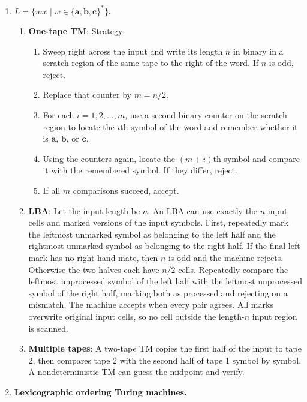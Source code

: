 \begin{enumerate}[{11.}1. ]
\item \textbf{$L = \{ww \mid w\in\{\pmb{a},\pmb{b},\pmb{c}\}^*\}$.}

\begin{enumerate}
\item \textbf{One-tape TM}:
Strategy:
\begin{enumerate}[1.]
\item Sweep right across the input and write its length $n$ in binary in a scratch
region of the same tape to the right of the word. If $n$ is odd, reject.
\item Replace that counter by $m=n/2$.
\item For each $i=1,2,\ldots,m$, use a second binary counter on the scratch region
to locate the $i$th symbol of the word and remember whether it is $\pmb{a}$,
$\pmb{b}$, or $\pmb{c}$.
\item Using the counters again, locate the $(m+i)$th symbol and compare it with
the remembered symbol. If they differ, reject.
\item If all $m$ comparisons succeed, accept.
\end{enumerate}

\item \textbf{LBA}: Let the input length be $n$. An LBA can use exactly the $n$
input cells and marked versions of the input symbols. First, repeatedly mark the
leftmost unmarked symbol as belonging to the left half and the rightmost
unmarked symbol as belonging to the right half. If the final left mark has no
right-hand mate, then $n$ is odd and the machine rejects. Otherwise the two
halves each have $n/2$ cells. Repeatedly compare the leftmost unprocessed symbol
of the left half with the leftmost unprocessed symbol of the right half, marking
both as processed and rejecting on a mismatch. The machine accepts when every
pair agrees. All marks overwrite original input cells, so no cell outside the
length-$n$ input region is scanned.

\item \textbf{Multiple tapes}: A two-tape TM copies the first half of the input to tape 2, then compares tape 2 with the second half of tape 1 symbol by symbol. A nondeterministic TM can guess the midpoint and verify.
\end{enumerate}

\item \textbf{Lexicographic ordering Turing machines.}


\end{enumerate}
